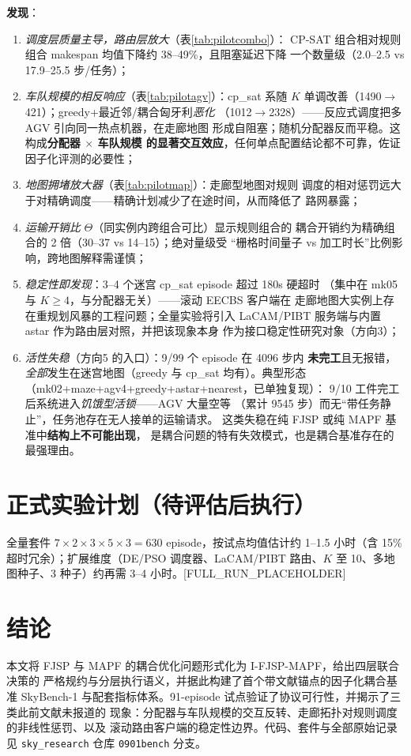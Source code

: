 \documentclass[UTF8,12pt,a4paper]{ctexart}
\begin{document}
\textbf{发现}：
\begin{enumerate}
  \item \emph{调度层质量主导，路由层放大}（表\ref{tab:pilotcombo}）：
    CP-SAT 组合相对规则组合 makespan 均值下降约 38--49\%，且阻塞延迟下降
    一个数量级（2.0--2.5 vs 17.9--25.5 步/任务）；
  \item \emph{车队规模的相反响应}（表\ref{tab:pilotagv}）：cp\_sat 系随 $K$
    单调改善（1490$\to$421）；greedy+最近邻/耦合匈牙利\emph{恶化}
    （1012$\to$2328）——反应式调度把多 AGV 引向同一热点机器，在走廊地图
    形成自阻塞；随机分配器反而平稳。这构成\textbf{分配器 $\times$ 车队规模
    的显著交互效应}，任何单点配置结论都不可靠，佐证因子化评测的必要性；
  \item \emph{地图拥堵放大器}（表\ref{tab:pilotmap}）：走廊型地图对规则
    调度的相对惩罚远大于对精确调度——精确计划减少了在途时间，从而降低了
    路网暴露；
  \item \emph{运输开销比} $\Theta$（同实例内跨组合可比）显示规则组合的
    耦合开销约为精确组合的 2 倍（30--37 vs 14--15）；绝对量级受
    ``栅格时间量子 vs 加工时长''比例影响，跨地图解释需谨慎；
  \item \emph{稳定性即发现}：3--4 个迷宫 cp\_sat episode 超过 180s 硬超时
    （集中在 mk05 与 $K{\ge}4$，与分配器无关）——滚动 EECBS 客户端在
    走廊地图大实例上存在重规划风暴的工程问题；全量实验将引入
    LaCAM/PIBT 服务端与内置 astar 作为路由层对照，并把该现象本身
    作为接口稳定性研究对象（方向3）；
  \item \emph{活性失稳}（方向5 的入口）：9/99 个 episode 在 4096 步内
    \textbf{未完工}且无报错，\emph{全部}发生在迷宫地图（greedy 与 cp\_sat
    均有）。典型形态（mk02+maze+agv4+greedy+astar+nearest，已单独复现）：
    9/10 工件完工后系统进入\emph{饥饿型活锁}——AGV 大量空等
    （累计 9545 步）而无``带任务静止''，任务池存在无人接单的运输请求。
    这类失稳在纯 FJSP 或纯 MAPF 基准中\textbf{结构上不可能出现}，
    是耦合问题的特有失效模式，也是耦合基准存在的最强理由。
\end{enumerate}

\section{正式实验计划（待评估后执行）}

全量套件 $7\times2\times3\times5\times3=630$ episode，按试点均值估计约
1--1.5 小时（含 15\% 超时冗余）；扩展维度（DE/PSO 调度器、LaCAM/PIBT
路由、$K$ 至 10、多地图种子、3 种子）约再需 3--4 小时。[FULL\_RUN\_PLACEHOLDER]

\section{结论}

本文将 FJSP 与 MAPF 的耦合优化问题形式化为 I-FJSP-MAPF，给出四层联合决策的
严格规约与分层执行语义，并据此构建了首个带文献锚点的因子化耦合基准 SkyBench-1
与配套指标体系。91-episode 试点验证了协议可行性，并揭示了三类此前文献未报道的
现象：分配器与车队规模的交互反转、走廊拓扑对规则调度的非线性惩罚、以及
滚动路由客户端的稳定性边界。代码、套件与全部原始记录见 \texttt{sky\_research}
仓库 \texttt{0901bench} 分支。



\end{document}
